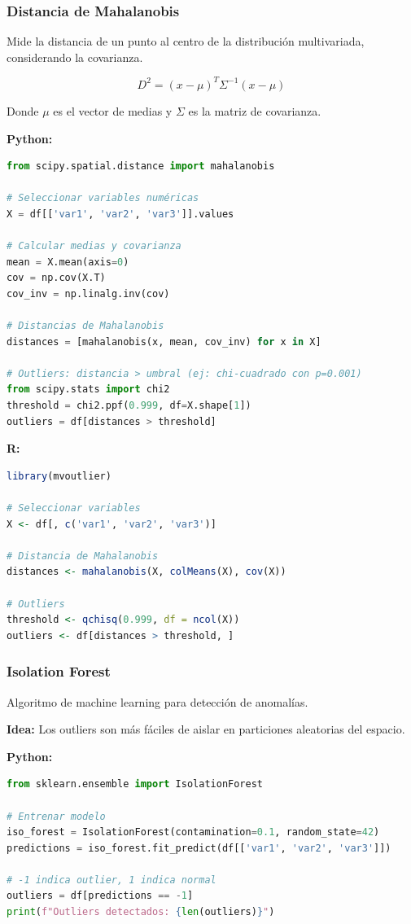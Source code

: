 \documentclass[a4paper,11pt]{article}
\begin{document}
\subsubsection{Distancia de Mahalanobis}

Mide la distancia de un punto al centro de la distribución multivariada, considerando la covarianza.

$$D^2 = (x - \mu)^T \Sigma^{-1} (x - \mu)$$

Donde $\mu$ es el vector de medias y $\Sigma$ es la matriz de covarianza.

\textbf{Python:}
\begin{lstlisting}[language=Python]
from scipy.spatial.distance import mahalanobis

# Seleccionar variables numéricas
X = df[['var1', 'var2', 'var3']].values

# Calcular medias y covarianza
mean = X.mean(axis=0)
cov = np.cov(X.T)
cov_inv = np.linalg.inv(cov)

# Distancias de Mahalanobis
distances = [mahalanobis(x, mean, cov_inv) for x in X]

# Outliers: distancia > umbral (ej: chi-cuadrado con p=0.001)
from scipy.stats import chi2
threshold = chi2.ppf(0.999, df=X.shape[1])
outliers = df[distances > threshold]
\end{lstlisting}

\textbf{R:}
\begin{lstlisting}[language=R]
library(mvoutlier)

# Seleccionar variables
X <- df[, c('var1', 'var2', 'var3')]

# Distancia de Mahalanobis
distances <- mahalanobis(X, colMeans(X), cov(X))

# Outliers
threshold <- qchisq(0.999, df = ncol(X))
outliers <- df[distances > threshold, ]
\end{lstlisting}

\subsubsection{Isolation Forest}

Algoritmo de machine learning para detección de anomalías.

\textbf{Idea:} Los outliers son más fáciles de aislar en particiones aleatorias del espacio.

\textbf{Python:}
\begin{lstlisting}[language=Python]
from sklearn.ensemble import IsolationForest

# Entrenar modelo
iso_forest = IsolationForest(contamination=0.1, random_state=42)
predictions = iso_forest.fit_predict(df[['var1', 'var2', 'var3']])

# -1 indica outlier, 1 indica normal
outliers = df[predictions == -1]
print(f"Outliers detectados: {len(outliers)}")
\end{lstlisting}
\end{document}
